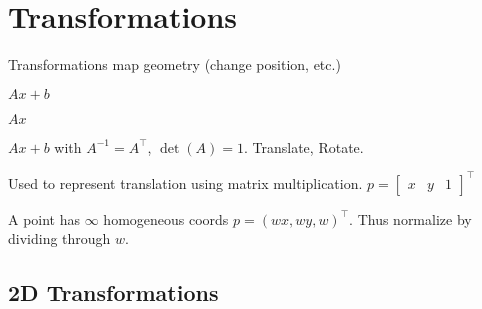 \section{Transformations}

Transformations map geometry (change position, etc.)

\begin{definition}
  \(Ax + b\)
\end{definition}

\begin{definition}[Linear]
  \(Ax\)
\end{definition}

\begin{definition}[Rigid]
  \(Ax + b\) with \(A^{-1} = A^\top\), \(\det(A) = 1\). Translate, Rotate.
\end{definition}

\begin{definition}
  Used to represent translation using matrix multiplication. \(p = \begin{bmatrix}
    x & y & 1
  \end{bmatrix}^\top\)
\end{definition}

\begin{theorem}
  A point has \(\infty\) homogeneous coords \(p = (wx, wy, w)^\top\).
  Thus normalize by dividing through \(w\).
\end{theorem}

\subsection{2D Transformations}

